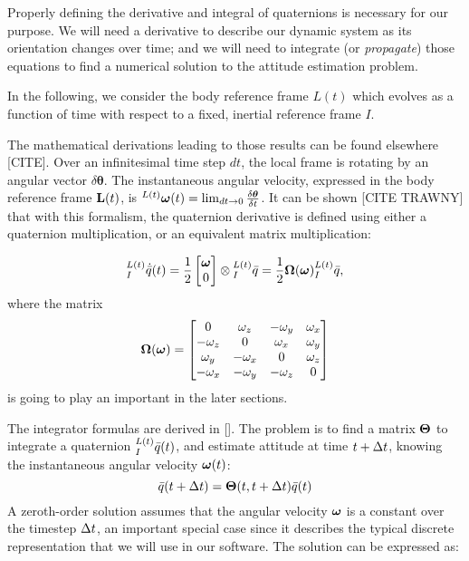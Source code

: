Properly defining the derivative and integral of quaternions is necessary for our purpose. We will need a derivative to describe our dynamic system as its orientation changes over time; and we will need to integrate (or \textit{propagate}) those equations to find a numerical solution to the attitude estimation problem.

In the following, we consider the body reference frame $L(t)$ which evolves as a function of time with respect to a fixed, inertial reference frame $I$. 

The mathematical derivations leading to those results can be found elsewhere [CITE]. Over an infinitesimal time step $dt$, the local frame is rotating by an angular vector $\delta\boldsymbol{\theta}$. The instantaneous angular velocity, expressed in the body reference frame $\textrm{\textbf{L}}(t)$, is ${}_{}^{L(t)}\boldsymbol\omega(t) = \lim_{dt\to 0}\frac{\delta\boldsymbol{\theta}}{\delta t}$. It can be shown [CITE TRAWNY] that with this formalism, the quaternion derivative is defined using either a quaternion multiplication, or an equivalent matrix multiplication:

\begin{equation}
{}_{I}^{L(t)}\dot{\bar{q}}(t) = \frac{1}{2}\begin{bmatrix} \boldsymbol\omega \\ 0 \end{bmatrix}\otimes {}_{I}^{L(t)}\bar{q} =  \frac{1}{2}\boldsymbol\Omega(\boldsymbol\omega){}_{I}^{L(t)}\bar{q},
\label{eq:quaternionDerivation}
\end{equation}
where the matrix
\begin{equation}
\boldsymbol\Omega(\boldsymbol\omega) = 
\begin{bmatrix}
0 & \omega_z & -\omega_y & \omega_x \\
-\omega_z & 0 & \omega_x & \omega_y \\
\omega_y & -\omega_x & 0 & \omega_z \\
-\omega_x & -\omega_y & -\omega_z & 0
\end{bmatrix}
\label{eq:Omega}
\end{equation}
is going to play an important in the later sections. 

The integrator formulas are derived in []. The problem is to find a matrix $\boldsymbol\Theta$ to integrate a quaternion ${}_{I}^{L(t)}\bar{q}(t)$, and estimate attitude at time $t+\Delta t$, knowing the instantaneous angular velocity $\boldsymbol\omega(t)$: 
\begin{equation}
\bar{q}(t+\Delta t) = \boldsymbol\Theta(t,t+\Delta t)\bar{q}(t)
\end{equation}
A zeroth-order solution assumes that the angular velocity $\boldsymbol\omega$ is a constant over the timestep $\Delta t$, an important special case since it describes the typical discrete representation that we will use in our software. The solution can be expressed as:

